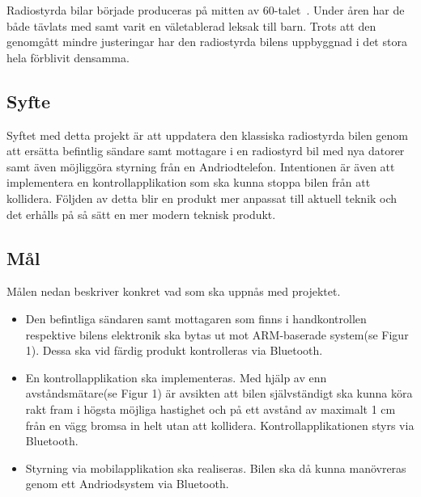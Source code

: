 \documentclass[a4paper]{article}
\begin{document}
Radiostyrda bilar började produceras på mitten av 60-talet~\cite{RCHistory}. Under åren har de både tävlats med samt varit en väletablerad leksak till barn. Trots att den genomgått mindre justeringar har den radiostyrda bilens uppbyggnad i det stora hela förblivit densamma.

\subsection{Syfte}

Syftet med detta projekt är att uppdatera den klassiska radiostyrda bilen genom att ersätta befintlig sändare samt mottagare i en radiostyrd bil med nya datorer samt även möjliggöra styrning från en Andriodtelefon. Intentionen är även att implementera en kontrollapplikation som ska kunna stoppa bilen från att kollidera. Följden av detta blir en produkt mer anpassat till aktuell teknik och det erhålls på så sätt en mer modern teknisk produkt.



\subsection{Mål}
Målen nedan beskriver konkret vad som ska uppnås med projektet.

\begin{itemize}
\item Den befintliga sändaren samt mottagaren som finns i handkontrollen respektive bilens elektronik ska bytas ut mot ARM-baserade system(se Figur 1). Dessa ska vid färdig produkt kontrolleras via Bluetooth.
\item En kontrollapplikation ska implementeras. Med hjälp av enn avståndsmätare(se Figur 1) är avsikten att bilen självständigt ska kunna köra rakt fram i högsta möjliga hastighet och på ett avstånd av maximalt 1 cm från en vägg bromsa in helt utan att kollidera. Kontrollapplikationen styrs via Bluetooth.
\item Styrning via mobilapplikation ska realiseras. Bilen ska då kunna manövreras genom ett Andriodsystem via Bluetooth.
\end{itemize}
\end{document}
